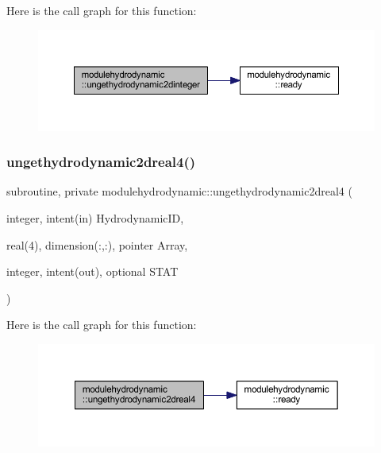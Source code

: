 Here is the call graph for this function\+:\nopagebreak
\begin{figure}[H]
\begin{center}
\leavevmode
\includegraphics[width=350pt]{namespacemodulehydrodynamic_a850463758a40d651e2c1a5de7adb45cc_cgraph}
\end{center}
\end{figure}
\mbox{\label{namespacemodulehydrodynamic_a7c4ba25ca6d8985ff9fc7b27aebbf48e}} 
\subsubsection{\texorpdfstring{ungethydrodynamic2dreal4()}{ungethydrodynamic2dreal4()}}
{\footnotesize\ttfamily subroutine, private modulehydrodynamic\+::ungethydrodynamic2dreal4 (\begin{DoxyParamCaption}\item[{integer, intent(in)}]{Hydrodynamic\+ID,  }\item[{real(4), dimension(\+:,\+:), pointer}]{Array,  }\item[{integer, intent(out), optional}]{S\+T\+AT }\end{DoxyParamCaption})\hspace{0.3cm}{\ttfamily [private]}}

Here is the call graph for this function\+:\nopagebreak
\begin{figure}[H]
\begin{center}
\leavevmode
\includegraphics[width=350pt]{namespacemodulehydrodynamic_a7c4ba25ca6d8985ff9fc7b27aebbf48e_cgraph}
\end{center}
\end{figure}
\mbox{\label{namespacemodulehydrodynamic_a38b09b823496f823b15a0b020595a9c1}} 
